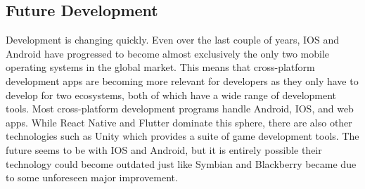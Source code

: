 \documentclass{article}
\begin{document}
\subsection{Future Development}
\tab Development is changing quickly. Even over the last couple of years, IOS and Android have progressed to become almost exclusively the only two mobile operating systems in the global market. This means that cross-platform development apps are becoming more relevant for developers as they only have to develop for two ecosystems, both of which have a wide range of development tools. Most cross-platform development programs handle Android, IOS, and web apps. While React Native and Flutter dominate this sphere, there are also other technologies such as Unity which provides a suite of game development tools. The future seems to be with IOS and Android, but it is entirely possible their technology could become outdated just like Symbian and Blackberry became due to some unforeseen major improvement.
\end{document}
